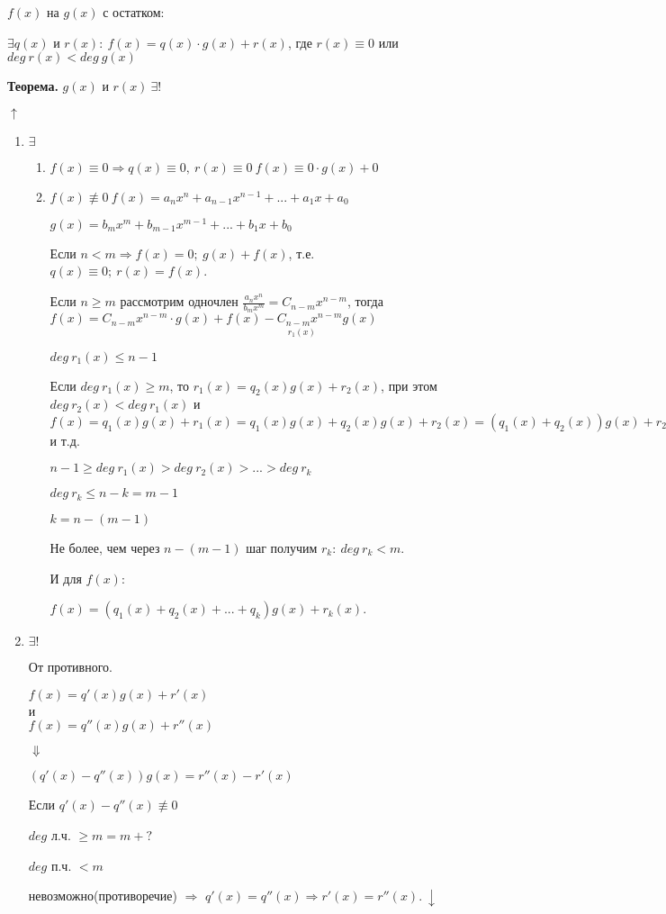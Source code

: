 \documentclass{article}
\begin{document}
    \(f(x)\) на \(g(x)\) с остатком:

    \(\exists q(x)\) и \(r(x):\ f(x) = q(x)\cdot g(x) + r(x)\), где \(r(x) \equiv 0\) или \(deg\ r(x) < deg\ g(x)\)

    \textbf{Теорема.} \(g(x)\) и \(r(x)\ \exists!\)
    
    \(\uparrow\)
    \begin{enumerate}
        \item \(\exists\)
            \begin{enumerate}
                \item \(f(x) \equiv 0 \Rightarrow q(x) \equiv 0,\ r(x) \equiv 0\ f(x) \equiv 0 \cdot g(x) + 0\)
                \item \(f(x) \not \equiv 0\ f(x) = a_nx^n+a_{n-1}x^{n-1}+...+a_1x+a_0\)
                
                \(g(x) = b_mx^m+b_{m-1}x^{m-1}+...+b_1x+b_0\)

                Если \(n < m \Rightarrow f(x) = 0;\ g(x)+f(x)\), т.е. \(q(x) \equiv 0;\ r(x) = f(x)\).

                Если \(n \geq m\) рассмотрим одночлен \(\frac{a_nx^n}{b_mx^m} = C_{n-m}x^{n-m}\), тогда \(f(x) = C_{n-m}x^{n-m}\cdot g(x)+\underset{r_1(x)}{f(x)-C_{n-m}x^{n-m}g(x)}\)

                \(deg\ r_1(x) \leq n-1\)

                Если \(deg\ r_1(x) \geq m\), то \(r_1(x)=q_2(x)g(x)+r_2(x)\), при этом \(deg\ r_2(x) < deg\ r_1(x)\) и \(f(x) = q_1(x)g(x)+r_1(x)=q_1(x)g(x)+q_2(x)g(x)+r_2(x)=(q_1(x)+q_2(x))g(x)+r_2(x)\) и т.д.

                \(n-1 \geq deg\ r_1(x) > deg\ r_2(x) > ... > deg\ r_k\)

                \(deg\ r_k \leq n-k = m-1\)

                \(k = n-(m-1)\)

                Не более, чем через \(n-(m-1)\) шаг получим \(r_k :\ deg\ r_k < m\).

                И для \(f(x):\)

                \(f(x) = (q_1(x)+q_2(x)+...+q_k)g(x)+r_k(x)\).
            \end{enumerate}
        \item \(\exists!\)
        
        От противного.

        \(f(x) = q'(x)g(x)+r'(x)\)\\
        и\\
        \(f(x) = q''(x)g(x)+r''(x)\)

        \(\Downarrow\)

        \((q'(x)-q''(x))g(x) = r''(x)-r'(x)\)

        Если \(q'(x)-q''(x) \not \equiv 0\)

        \(deg\) л.ч. \(\geq m = m + ?\)

        \(deg\) п.ч. \(< m\)

        невозможно(противоречие) \(\Rightarrow\) \(q'(x) = q''(x) \Rightarrow r'(x) = r''(x).\ \downarrow\)
    \end{enumerate}
\end{document}
